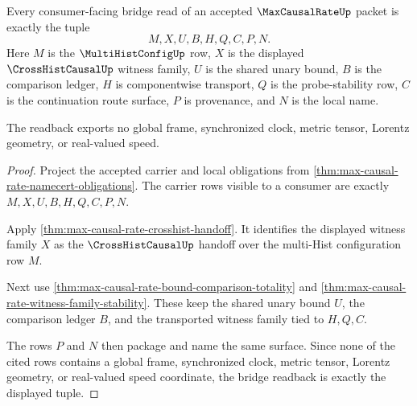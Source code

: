 \begin{theorem}
\label{thm:max-causal-rate-bridge-readback}
Every consumer-facing bridge read of an accepted $\MaxCausalRateUp$ packet is exactly the tuple
$$
M,X,U,B,H,Q,C,P,N.
$$
Here $M$ is the $\MultiHistConfigUp$ row, $X$ is the displayed $\CrossHistCausalUp$ witness family, $U$ is the shared unary bound, $B$ is the comparison ledger, $H$ is componentwise transport, $Q$ is the probe-stability row, $C$ is the continuation route surface, $P$ is provenance, and $N$ is the local name.

The readback exports no global frame, synchronized clock, metric tensor, Lorentz geometry, or real-valued speed.
\end{theorem}
\begin{proof}
Project the accepted carrier and local obligations from \autoref{thm:max-causal-rate-namecert-obligations}. The carrier rows visible to a consumer are exactly $M,X,U,B,H,Q,C,P,N$.

Apply \autoref{thm:max-causal-rate-crosshist-handoff}. It identifies the displayed witness family $X$ as the $\CrossHistCausalUp$ handoff over the multi-Hist configuration row $M$.

Next use \autoref{thm:max-causal-rate-bound-comparison-totality} and \autoref{thm:max-causal-rate-witness-family-stability}. These keep the shared unary bound $U$, the comparison ledger $B$, and the transported witness family tied to $H,Q,C$.

The rows $P$ and $N$ then package and name the same surface. Since none of the cited rows contains a global frame, synchronized clock, metric tensor, Lorentz geometry, or real-valued speed coordinate, the bridge readback is exactly the displayed tuple.
\end{proof}

